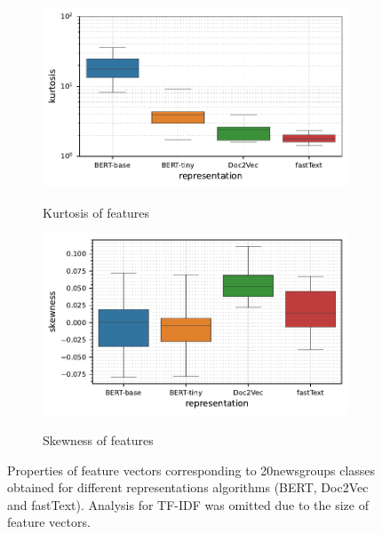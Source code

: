 \begin{figure}[t]
\begin{subfigure}[b]{0.495\textwidth}
        \caption{\small Kurtosis of features}
        \includegraphics[width=\textwidth]{images/real-characteristics/text-20newsgroups/properties-20newsgroups-kurt(representation,representation)-representation_BERT-base,BERT-tiny,Doc2Vec,fastText-class_0,16-data_ID-train.pdf}
        \label{fig:text-20newsgroups-curtosis}
    \end{subfigure}
    \hfill
    \begin{subfigure}[b]{0.495\textwidth}
        \centering
        \caption{\small Skewness of features}
        \includegraphics[width=\textwidth]{images/real-characteristics/text-20newsgroups/properties-20newsgroups-skew(representation,representation)-representation_BERT-base,BERT-tiny,Doc2Vec,fastText-class_0,16-data_ID-train.pdf}
        \label{fig:text-20newsgroups-skewness}
    \end{subfigure}
    \caption{Properties of feature vectors corresponding to 20newsgroups classes obtained for different representations algorithms (BERT, Doc2Vec and fastText). Analysis for TF-IDF was omitted due to the size of feature vectors.}
    \label{fig:characteristics-text-20newsgroups}
\end{figure}

